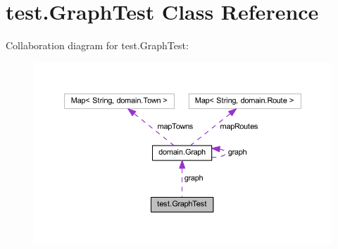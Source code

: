 \hypertarget{classtest_1_1_graph_test}{}\section{test.\+Graph\+Test Class Reference}
\label{classtest_1_1_graph_test}


Collaboration diagram for test.\+Graph\+Test\+:\nopagebreak
\begin{figure}[H]
\begin{center}
\leavevmode
\includegraphics[width=350pt]{classtest_1_1_graph_test__coll__graph}
\end{center}
\end{figure}
